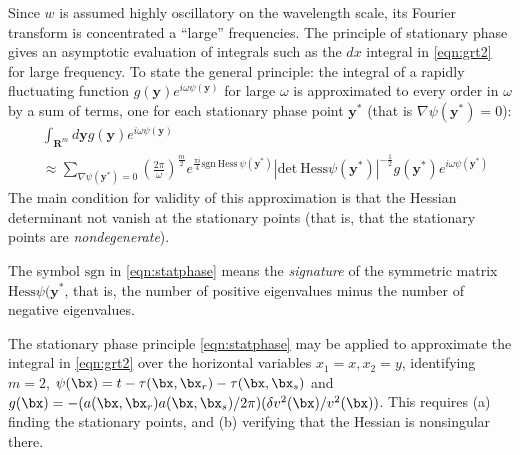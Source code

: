 Since $w$ is assumed highly oscillatory on the wavelength scale, its Fourier transform is concentrated a ``large'' frequencies. The principle of stationary
phase \cite[]{GuiSte:79,BleisteinCohenStockwell:01} gives an asymptotic evaluation of integrals such as the $dx$ integral in \ref{eqn:grt2} for large frequency.
To state the general principle: the integral of a rapidly fluctuating function
$g(\mathbf{y})e^{i\omega\psi(\mathbf{y})}$ for large $\omega$ is approximated to every order in $\omega$ by a
sum of terms, one for each stationary phase point $\mathbf{y^*}$ (that is $\nabla\psi(\mathbf{y^*})=0$): 
\begin{equation}
\label{eqn:statphase}
\begin{aligned} 
&\int_{\mathbf{R}^m}d\mathbf{y} g(\mathbf{y})e^{i\omega \psi(\mathbf{y})}\\
&\approx \sum_{\nabla
  \psi(\mathbf{y^*})=0}\left(\frac{2\pi}{\omega}\right)^{\frac{m}{2}}e^{\frac{\pi
    i}{4}\mathrm{sgn}\ \mathrm{Hess} \ \psi(\mathbf{y}^*)}
|\mathrm{det}\ \mathrm{Hess}\psi(\mathbf{y}^*)|^{-\frac{1}{2}}g(\mathbf{y}^*)e^{i\omega \psi(\mathbf{y}^*)}
\end{aligned}
\end{equation}
The main condition for validity of this approximation is that the Hessian determinant not vanish at the stationary points (that is, that the stationary points are {\em nondegenerate}).

 The symbol $\mathrm{sgn}$ in \ref{eqn:statphase} means the {\em signature} of the symmetric matrix $\mathrm{Hess}  \psi(\mathbf{y}^*$, that is, the number of positive eigenvalues minus the number of negative eigenvalues.

The stationary phase principle \ref{eqn:statphase} may be applied to approximate the integral in \ref{eqn:grt2} over the horizontal variables $x_1=x,x_2=y$, identifying $m=2$, $\psi(\bx) = t - \tau(\bx,\bx_r) - \tau(\bx,\bx_s)$ and $g(\bx) = -(a(\bx,\bx_r)a(\bx,\bx_s)/2\pi)(\delta v^2(\bx)/v^2(\bx))$. This requires (a) finding the stationary points, and (b) verifying that the Hessian is nonsingular there.

